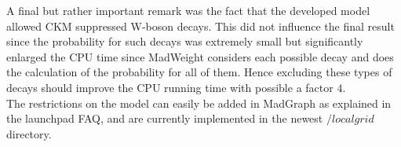 A final but rather important remark was the fact that the developed model allowed CKM suppressed W-boson decays. This did not influence the final result since the probability for such decays was extremely small but significantly enlarged the CPU time since MadWeight considers each possible decay and does the calculation of the probability for all of them. Hence excluding these types of decays should improve the CPU running time with possible a factor $4$.\\
The restrictions on the model can easily be added in MadGraph as explained in the launchpad FAQ, and are currently implemented in the newest $/localgrid$ directory.